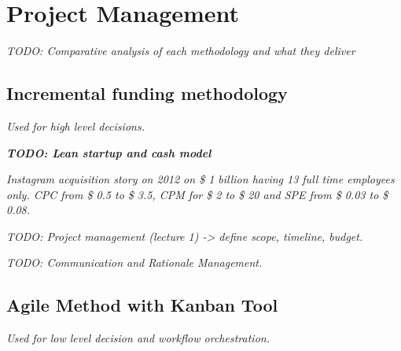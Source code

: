 %
%
\chapter{Project Management}

\textit{TODO: Comparative analysis of each methodology and what they deliver}

\section{Incremental funding methodology}

\textit{Used for high level decisions.} 

\textbf{\textit{TODO: Lean startup and cash model}} \cite{2024_Lean_Startup}

\textit{Instagram acquisition story on 2012 on \$ 1 billion having 13 full time employees only. CPC from \$ 0.5 to \$ 3.5, CPM for \$ 2 to \$ 20 and SPE from \$ 0.03 to \$ 0.08.} \cite{2012_IG_Acquisition}

\textit{TODO: Project management (lecture 1) -> define scope, timeline, budget.}

\textit{TODO: Communication and Rationale Management.}

\section{Agile Method with Kanban Tool}

\textit{Used for low level decision and workflow orchestration.}



\clearpage